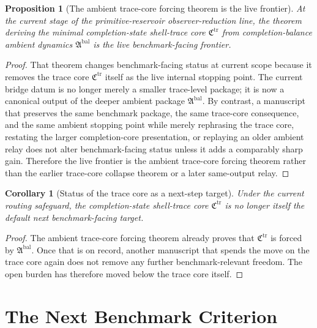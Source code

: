 \documentclass[11pt]{article}
\newcommand{\TraceCore}{\mathfrak C^{\mathrm{tr}}}
\newcommand{\AmbientPackage}{\mathfrak A^{\mathrm{bal}}}
\newtheorem{proposition}{Proposition}
\newtheorem{corollary}{Corollary}
\begin{document}
\begin{proposition}[The ambient trace-core forcing theorem is the live frontier]
At the current stage of the primitive-reservoir observer-reduction line, the theorem deriving the minimal completion-state shell-trace core \(\TraceCore\) from completion-balance ambient dynamics \(\AmbientPackage\) is the live benchmark-facing frontier.
\end{proposition}

\begin{proof}
That theorem changes benchmark-facing status at current scope because it removes the trace core \(\TraceCore\) itself as the live internal stopping point. The current bridge datum is no longer merely a smaller trace-level package; it is now a canonical output of the deeper ambient package \(\AmbientPackage\). By contrast, a manuscript that preserves the same benchmark package, the same trace-core consequence, and the same ambient stopping point while merely rephrasing the trace core, restating the larger completion-core presentation, or replaying an older ambient relay does not alter benchmark-facing status unless it adds a comparably sharp gain. Therefore the live frontier is the ambient trace-core forcing theorem rather than the earlier trace-core collapse theorem or a later same-output relay.
\end{proof}

\begin{corollary}[Status of the trace core as a next-step target]
Under the current routing safeguard, the completion-state shell-trace core \(\TraceCore\) is no longer itself the default next benchmark-facing target.
\end{corollary}

\begin{proof}
The ambient trace-core forcing theorem already proves that \(\TraceCore\) is forced by \(\AmbientPackage\). Once that is on record, another manuscript that spends the move on the trace core again does not remove any further benchmark-relevant freedom. The open burden has therefore moved below the trace core itself.
\end{proof}

\section{The Next Benchmark Criterion}
\end{document}
